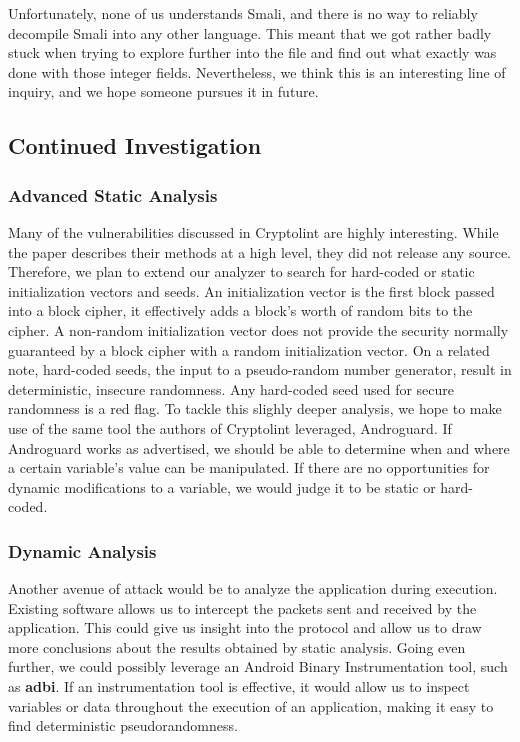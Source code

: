 \documentclass[11pt]{article}
\numberwithin{theorem}{subsection}
\begin{document}
Unfortunately, none of us understands Smali, and there is no way to reliably decompile Smali into any other language.  This meant that we got rather badly
stuck when trying to explore further into the file and find out what exactly was done with those integer fields.  Nevertheless, we think this is an
interesting line of inquiry, and we hope someone pursues it in future.

\subsection{Continued Investigation}

\subsubsection{Advanced Static Analysis}
  Many of the vulnerabilities discussed in Cryptolint are highly interesting. While the paper describes their methods at a high level, they did not
release any source. Therefore, we plan to extend our analyzer to search for hard-coded or static initialization vectors and seeds. An initialization vector
is the first block passed into a block cipher, it effectively adds a block's worth of random bits to the cipher. A non-random initialization vector
does not provide the security normally guaranteed by a block cipher with a random initialization vector. On a related note, hard-coded seeds,
the input to a pseudo-random number generator, result in deterministic, insecure randomness. Any hard-coded seed used for secure randomness
is a red flag.
  To tackle this slighly deeper analysis, we hope to make use of the same tool the authors of Cryptolint leveraged, Androguard. If Androguard works
as advertised, we should be able to determine when and where a certain variable's value can be manipulated. If there are no opportunities for dynamic modifications
to a variable, we would judge it to be static or hard-coded.

\subsubsection{Dynamic Analysis}

  Another avenue of attack would be to analyze the application during execution. Existing software allows us to intercept the packets sent
and received by the application. This could give us insight into the protocol and allow us to draw more conclusions about the results
obtained by static analysis. Going even further, we could possibly leverage an Android Binary Instrumentation tool, such as \textbf{adbi}. If an
instrumentation tool is effective, it would allow us to inspect variables or data throughout the execution of an application, making it easy
to find deterministic pseudorandomness.
\end{document}
